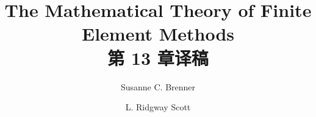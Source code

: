 \documentclass[a4paper,UTF8,12pt]{ctexart}
\title{The Mathematical Theory of Finite Element Methods\\第 13 章译稿}
\author{Susanne C. Brenner \and L. Ridgway Scott}
\date{}
\begin{document}
\maketitle
\setcounter{section}{12}
\renewcommand{\thethmcount}{\thesubsection.\arabic{thmcount}}
\renewcommand{\theequation}{\thesubsection.\arabic{equation}}
\renewcommand{\thefigure}{\thesection.\arabic{figure}}
\renewcommand{\thetable}{\thesection.\arabic{table}}

\end{document}
